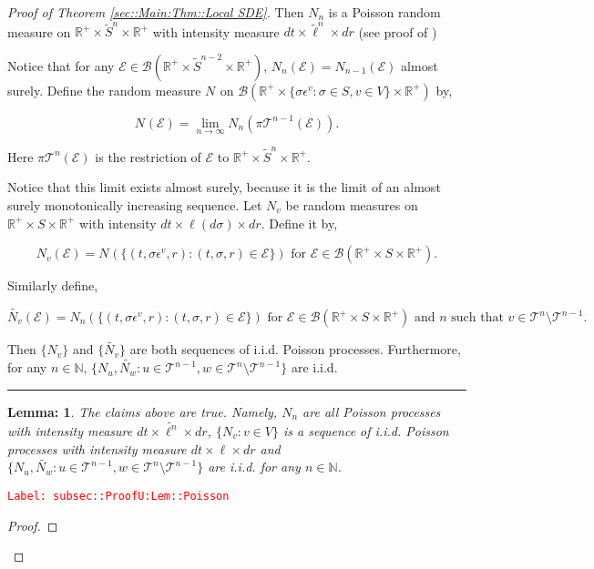 \documentclass[12pt]{article}
\newcommand{\mb}{\mathbb}
\newcommand{\mc}{\mathcal}
\newcommand{\ms}{\mathscr}
\newcommand{\ra}{\rightarrow}
\newcommand{\te}{\text}
\newcommand{\ep}{\epsilon}
\newcommand{\tr}{\textcolor{red}}
\newcommand{\labe}[1]{\tr{\texttt{Label: #1}}}
\newcommand{\ind}{\hspace{24pt}}
\newcommand{\lin}{\rule{\linewidth}{0.4 pt}}
\renewcommand{\v}{v}							%
\newcommand{\vv}{u}								%
\newcommand{\vvv}{w}							%
\renewcommand{\S}{S}							%
\newcommand{\s}{\sigma}							%
\newcommand{\ev}[1]{\ep^{#1}}					%
\renewcommand{\t}{t}							%
\newcommand{\proj}{\pi}							%
\newcommand{\tree}{\mc{T}}						%
\newcommand{\sln}[1]{^{#1}}						%
\newcommand{\poiss}[1]{N_{#1}}						%
\renewcommand{\r}{r}								%
\newcommand{\Sm}{\ell}								%
\newcommand{\alt}{\widetilde}						%
\newcommand{\evnt}{\mc{E}}						%
\newtheorem{lem}[thms]{Lemma: }
\begin{document}
\begin{proof}[Proof of Theorem \ref{sec::Main:Thm::Local SDE}]
Then \(\poiss{n}\) is a Poisson random measure on \(\mb{R}^+\times\alt{\S}^n\times \mb{R}^+\) with intensity measure \(d\t\times \alt{\Sm}^n\times d\r\) (see proof of \cite[Theorem 14.7.1(b)]{DalVer08})

\ind Notice that for any \(\evnt \in \ms{B}(\mb{R}^+\times \alt{\S}^{n-2}\times \mb{R}^+)\), \(\poiss{n}(\evnt) = \poiss{n-1}(\evnt)\) almost surely. Define the random measure \(\poiss{}\) on \(\ms{B}(\mb{R}^+\times \{\s\ev{\v}:\s\in \S,\v \in  V\}\times \mb{R}^+)\) by,

\[\poiss{}(\evnt) = \lim_{n \ra\infty}\poiss{n}\left(\proj{\tree\sln{n-1}}{}(\evnt)\right).\]

Here \(\proj{\tree\sln{n}}{}(\evnt)\) is the restriction of \(\evnt\) to \(\mb{R}^+\times \alt{\S}^n\times\mb{R}^+\). 

\ind Notice that this limit exists almost surely, because it is the limit of an almost surely monotonically increasing sequence. Let \(\poiss{\v}\) be random measures on \(\mb{R}^+\times\S\times\mb{R}^+\) with intensity \(d\t\times\Sm(d\s)\times d\r\). Define it by,

\[\poiss{\v}(\evnt) = \poiss{}\left(\{(\t,\s\ev{\v},\r):(\t,\s,\r)\in \evnt\}\right) \te{ for } \evnt \in \ms{B}(\mb{R}^+\times\S\times\mb{R}^+).\]

Similarly define,

\[\alt{\poiss{\v}}(\evnt) = \poiss{n}\left(\{(\t,\s\ev{\v},\r):(\t,\s,\r)\in \evnt\}\right)\te{ for } \evnt \in \ms{B}(\mb{R}^+\times\S\times\mb{R}^+)\te{ and }n\te{ such that } \v\in \tree\sln{n}\setminus\tree\sln{n-1}.\]

Then \(\{\poiss{\v}\}\) and \(\{\alt{\poiss{\v}}\}\) are both sequences of i.i.d. Poisson processes. Furthermore, for any \(n \in \mb{N}\), \(\{\poiss{\vv},\alt{\poiss{\vvv}}:\vv\in \tree\sln{n-1},\vvv\in\tree\sln{n}\setminus\tree\sln{n-1}\}\) are i.i.d.

\lin

\begin{lem}
The claims above are true. Namely, \(\poiss{n}\) are all Poisson processes with intensity measure \(d\t\times\alt{\Sm^{n}}\times d\r\), \(\{\poiss{\v}:\v\in V\}\) is a sequence of i.i.d. Poisson processes with intensity measure \(d\t\times\Sm\times d\r\) and \(\{\poiss{\vv},\alt{\poiss{\vvv}}:\vv\in \tree\sln{n-1},\vvv\in\tree\sln{n}\setminus\tree\sln{n-1}\}\) are i.i.d. for any \(n \in \mb{N}\).

\label{subsec::ProofU:Lem::Poisson}
\end{lem}
\labe{subsec::ProofU:Lem::Poisson}
\begin{proof}


\end{proof}
\end{proof}
\end{document}
